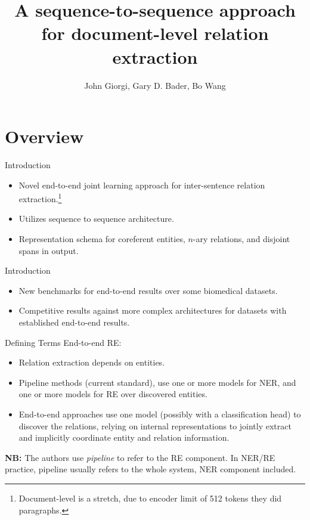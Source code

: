 \documentclass[usenames,dvipsnames,pdf]{beamer}
\title{A sequence-to-sequence approach for document-level relation extraction}
\author{John Giorgi, Gary D. Bader, Bo Wang}
\begin{document}
	\begin{frame}
		\titlepage
	\end{frame}


        \section{Overview}

        \begin{frame}{Introduction}
          \begin{itemize}
          \item
            Novel end-to-end joint learning approach for inter-sentence relation extraction.\footnote{Document-level is a stretch, due to encoder limit of 512 tokens they did paragraphs.}
          \item
            Utilizes sequence to sequence architecture.
          \item
            Representation schema for coreferent entities, $n$-ary relations, and disjoint spans in output.
          \end{itemize}
        \end{frame}

        \begin{frame}{Introduction}
          \begin{itemize}
          \item
            New benchmarks for end-to-end results over some biomedical datasets.
          \item
            Competitive results against more complex architectures for datasets
            with established end-to-end results.
          \end{itemize}
        \end{frame}

        \begin{frame}{Defining Terms}
          End-to-end RE:
          \begin{itemize}
          \item
            Relation extraction depends on entities.
          \item
            Pipeline methods (current standard),
            use one or more models for NER,
            and one or more models for RE over discovered entities.
          \item
            End-to-end approaches use one model
            (possibly with a classification head)
            to discover the relations,
            relying on internal representations to jointly extract
            and implicitly coordinate entity and relation information.
          \end{itemize}

          \textbf{NB:}  The authors use \textit{pipeline} to refer to the RE component.
          In NER/RE practice, pipeline usually refers to the whole system, NER component included.  
        \end{frame}
\end{document}

